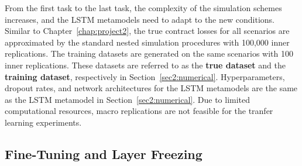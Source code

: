 From the first task to the last task, the complexity of the simulation schemes increases, and the LSTM metamodels need to adapt to the new conditions.
Similar to Chapter~\ref{chap:project2}, the true contract losses for all scenarios are approximated by the standard nested simulation procedures with 100,000 inner replications. 
The training datasets are generated on the same scenarios with 100 inner replications.
These datasets are referred to as the \textbf{true dataset} and the \textbf{training dataset}, respectively in Section~\ref{sec2:numerical}.
Hyperparameters, dropout rates, and network architectures for the LSTM metamodels are the same as the LSTM metamodel in Section~\ref{sec2:numerical}. 
Due to limited computational resources, macro replications are not feasible for the tranfer learning experiments.

\subsection{Fine-Tuning and Layer Freezing}

